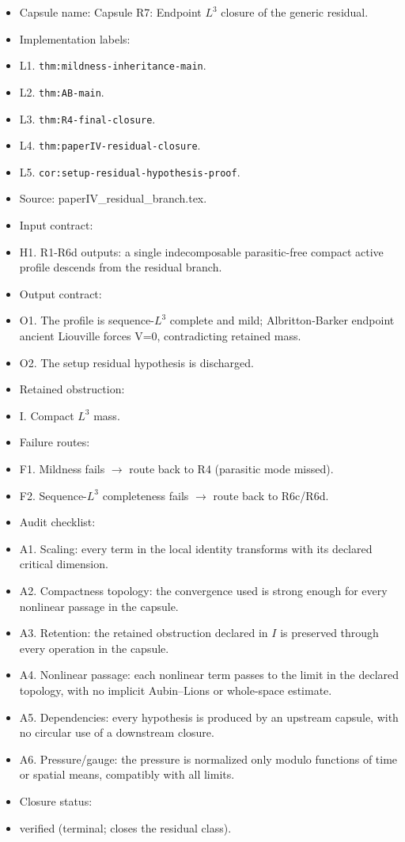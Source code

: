 \documentclass[11pt]{amsart}
\begin{document}
\begin{itemize}
  \item Capsule name: Capsule R7: Endpoint $L^3$ closure of the generic residual.
  \item Implementation labels:
  \item L1. \texttt{thm:mildness-inheritance-main}.
  \item L2. \texttt{thm:AB-main}.
  \item L3. \texttt{thm:R4-final-closure}.
  \item L4. \texttt{thm:paperIV-residual-closure}.
  \item L5. \texttt{cor:setup-residual-hypothesis-proof}.
  \item Source: paperIV\_residual\_branch.tex.
  \item Input contract:
  \item H1. R1-R6d outputs: a single indecomposable parasitic-free compact active profile descends from the residual branch.
  \item Output contract:
  \item O1. The profile is sequence-$L^3$ complete and mild; Albritton-Barker endpoint ancient Liouville forces V=0, contradicting retained mass.
  \item O2. The setup residual hypothesis is discharged.
  \item Retained obstruction:
  \item I. Compact $L^3$ mass.
  \item Failure routes:
  \item F1. Mildness fails $\to$ route back to R4 (parasitic mode missed).
  \item F2. Sequence-$L^3$ completeness fails $\to$ route back to R6c/R6d.
  \item Audit checklist:
  \item A1. Scaling: every term in the local identity transforms with its declared critical dimension.
  \item A2. Compactness topology: the convergence used is strong enough for every nonlinear passage in the capsule.
  \item A3. Retention: the retained obstruction declared in $I$ is preserved through every operation in the capsule.
  \item A4. Nonlinear passage: each nonlinear term passes to the limit in the declared topology, with no implicit Aubin--Lions or whole-space estimate.
  \item A5. Dependencies: every hypothesis is produced by an upstream capsule, with no circular use of a downstream closure.
  \item A6. Pressure/gauge: the pressure is normalized only modulo functions of time or spatial means, compatibly with all limits.
  \item Closure status:
  \item verified (terminal; closes the residual class).
\end{itemize}
\end{document}
